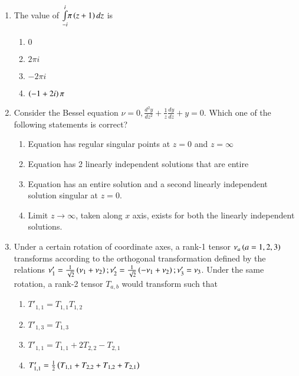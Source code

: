\documentclass[journal]{IEEEtran}
\begin{document}
\begin{enumerate}
    \item The value of $\underset{-i}{\overset{i}{\int}}\pi\left(z+1\right)dz$ is 

        \begin{multicols}{4}
            \begin{enumerate}
                \item $0$
                \item $2\pi i$
                \item $-2\pi i$
                \item $\left(-1+2i\right)\pi$
            \end{enumerate}
        \end{multicols}
		
    \item Consider the Bessel equation $\nu=0,\frac{d^2y}{dz^2}+\frac{1}{z}\frac{dy}{dz}+y=0$. Which one of the following statements is correct?


            \begin{enumerate}
                \item Equation has regular singular points at $z=0$ and $z=\infty$
                \item Equation has 2 linearly independent solutions that are entire
                \item Equation has an entire solution and a second linearly independent solution singular at $z=0$.
                \item Limit $z\rightarrow\infty$, taken along $x$ axis, exists for both the linearly independent solutions.
            \end{enumerate}


    \item Under a certain rotation of coordinate axes, a rank-1 tensor $\nu_a \left(a=1,2,3\right)$ transforms according to the orthogonal transformation defined by the relations $\nu_1'=\frac{1}{\sqrt{2}}\left(\nu_1+\nu_2\right);\nu_2'=\frac{1}{\sqrt{2}}\left(-\nu_1+\nu_2\right);\nu_3'=\nu_3$. Under the same rotation, a rank-2 tensor $T_{a,b}$ would transform such that

        \begin{multicols}{2}
            \begin{enumerate}
                \item $T'_{1,1}=T_{1,1}T_{1,2}$
                \item $T'_{1,3}=T_{1,3}$
                \item $T'_{1,1}=T_{1,1}+2T_{2,2}-T_{2,1}$
                \item $T'_{1,1}=\frac{1}{2}\left(T_{1,1}+T_{2,2}+T_{1,2}+T_{2,1}\right)$
            \end{enumerate}
        \end{multicols}


\end{enumerate}
\end{document}
